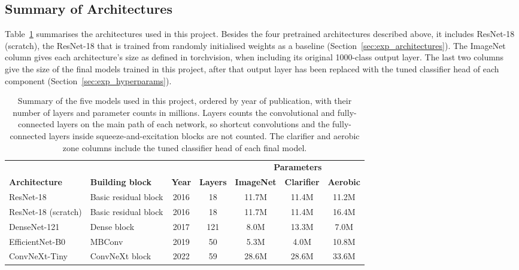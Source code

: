 \FloatBarrier
\subsection{Summary of Architectures}\label{sec:arch_summary}

Table~\ref{tab:arch_summary} summarises the architectures used in this project. Besides the four pretrained architectures described above, it includes ResNet-18 (scratch), the ResNet-18 that is trained from randomly initialised weights as a baseline (Section~\ref{sec:exp_architectures}). The ImageNet column gives each architecture's size as defined in torchvision, when including its original 1000-class output layer. The last two columns give the size of the final models trained in this project, after that output layer has been replaced with the tuned classifier head of each component (Section~\ref{sec:exp_hyperparams}).

\begin{table}[htbp]
\centering
\setlength{\tabcolsep}{4pt}
\caption{Summary of the five models used in this project, ordered by year of publication, with their number of layers and parameter counts in millions. Layers counts the convolutional and fully-connected layers on the main path of each network, so shortcut convolutions and the fully-connected layers inside squeeze-and-excitation blocks are not counted. The clarifier and aerobic zone columns include the tuned classifier head of each final model.}\label{tab:arch_summary}
\begin{tabular}{llccccc}
\toprule
 & & & & \multicolumn{3}{c}{\textbf{Parameters}} \\
\cmidrule(lr){5-7}
\textbf{Architecture} & \textbf{Building block} & \textbf{Year} & \textbf{Layers} & \textbf{ImageNet} & \textbf{Clarifier} & \textbf{Aerobic} \\
\midrule
ResNet-18       & Basic residual block    & 2016 & 18  & 11.7M & 11.4M & 11.2M \\
ResNet-18 (scratch) & Basic residual block & 2016 & 18  & 11.7M & 11.4M & 16.4M \\
DenseNet-121    & Dense block             & 2017 & 121 & 8.0M  & 13.3M & 7.0M  \\
EfficientNet-B0 & MBConv                  & 2019 & 50  & 5.3M  & 4.0M  & 10.8M \\
ConvNeXt-Tiny   & ConvNeXt block          & 2022 & 59  & 28.6M & 28.6M & 33.6M \\
\bottomrule
\end{tabular}
\end{table}

